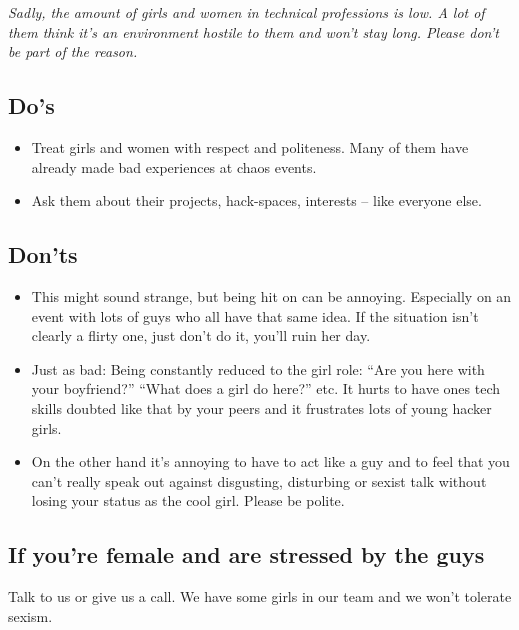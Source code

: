 \documentclass[10pt]{leaflet}
\begin{document}
\emph{Sadly, the amount of girls and women in technical professions is
  low. A lot of them think it's an environment hostile to them and
  won't stay long. Please don't be part of the reason.}
\subsection{Do's}
\label{sec-2-1}
\begin{itemize}
\item Treat girls and women with respect and politeness. Many of them
  have already made bad experiences at chaos events.
\item Ask them about their projects, hack-spaces, interests -- like
  everyone else.
\end{itemize}
\subsection{Don'ts}
\label{sec-2-2}
\begin{itemize}
\item This might sound strange, but being hit on can be
  annoying. Especially on an event with lots of guys who all have that
  same idea. If the situation isn't clearly a flirty one, just don't
  do it, you'll ruin her day.
\item Just as bad: Being constantly reduced to the girl role: ``Are
  you here with your boyfriend?'' ``What does a girl do here?''
  etc. It hurts to have ones tech skills doubted like that by your
  peers and it frustrates lots of young hacker girls.
\item On the other hand it's annoying to have to act like a guy and to
  feel that you can't really speak out against disgusting, disturbing
  or sexist talk without losing your status as the cool girl. Please
  be polite.
\end{itemize}

\subsection{If you're female and are stressed by the guys}
Talk to us or give us a call. We have some girls in our team and we
won't tolerate sexism.\\ \\
\end{document}
